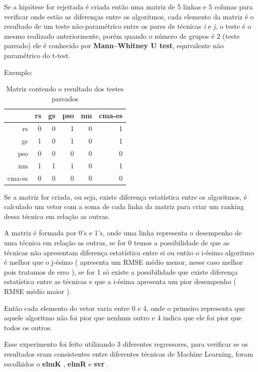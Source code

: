 \documentclass[preprint,12pt]{elsarticle}
\begin{document}
Se a hipótese for rejeitada é criada então uma matriz de 5 linhas e 5 colunas para verificar onde estão as diferenças entre os algoritmos, cada elemento da matriz é o resultado de um teste não-paramétrico entre os pares de técnicas \textit{i} e \textit{j}, o teste é o mesmo realizado anteriormente, porém quando o número de grupos é 2 (teste pareado) ele é conhecido por \textbf{Mann–Whitney U test}, equivalente não paramétrico do t-test.

Exemplo:


\begin{table}[h]
	\centering
	\begin{tabular}{|r|r|r|r|r|r|}
		\hline
		& rs & gs & pso & nm & cma-es \\
		\hline
		rs & 0 &   0 &   1 &   0 &   1 \\
		\hline
		gs & 1 &     0 &     1 &     0 &     1 \\
		\hline		
		pso & 0 &     0 &     0 &     0 &     0 \\
		\hline		
		nm & 1 &     1 &     1 &     0 &     1 \\
		\hline		
		cma-es & 0 &     0 &     0 &     0 &     0 \\
		\hline
	\end{tabular}
	\caption{Matriz contendo o resultado dos testes pareados}
\end{table}




Se a matriz for criada, ou seja, existe diferença estatística entre os algoritmos, é calculado um vetor com a soma de cada linha da matriz para criar um ranking dessa técnica em relação as outras. 

A matriz é formada por 0's e 1's, onde uma linha representa o desempenho de uma técnica em relação as outras, se for 0 temos a possibilidade de que as técnicas não apresentam diferença estatística entre si ou então o i-ésimo algoritmo é melhor que o j-ésimo ( apresenta um RMSE médio menor, nesse caso melhor pois tratamos de erro ), se for 1 só existe a possibilidade que existe diferença estatística entre as técnicas e que a i-ésima apresenta um pior desempenho ( RMSE médio maior ).

Então cada elemento do vetor varia entre 0 e 4, onde o primeiro representa que aquele algoritmo não foi pior que nenhum outro e 4 indica que ele foi pior que todos os outros.

Esse experimento foi feito utilizando 3 diferentes regressores, para verificar se os resultados eram consistentes entre diferentes técnicas de Machine Learning, foram escolhidos o \textbf{elmK} \cite{GuangBinHuang2012}, \textbf{elmR} \cite{GuangBinHuang2012} e \textbf{svr} \cite{drucker1997support}.
\end{document}
